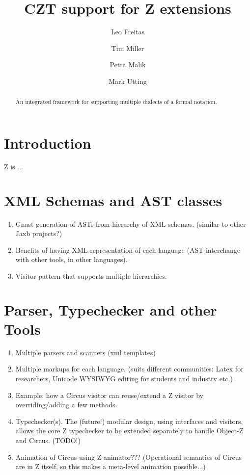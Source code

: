 \documentclass{llncs}
\begin{document}
\title{CZT support for Z extensions}
\author{Leo Freitas \and Tim Miller \and Petra Malik \and Mark Utting}
\maketitle

\begin{abstract}
  An integrated framework for supporting multiple dialects of a formal
  notation.
\end{abstract}


\section{Introduction} \label{sec:intro}

  Z\cite{isoz} is ...

\section{XML Schemas and AST classes}

  \begin{enumerate}
    \item Gnast generation of ASTs from hierarchy of XML schemas.
      (similar to other Jaxb projects?)

    \item Benefits of having XML representation of each language
      (AST interchange with other tools, in other languages).

    \item Visitor pattern that supports multiple hierarchies.
  \end{enumerate}

\section{Parser, Typechecker and other Tools}

  \begin{enumerate}
    \item Multiple parsers and scanners (xml templates)
    \item Multiple markups for each language.
      (suits different communities:  Latex for researchers,
      Unicode WYSIWYG editing for students and industry etc.)
    \item Example: how a Circus visitor can reuse/extend a Z visitor
      by overriding/adding a few methods.
    \item Typechecker(s).
      The (future!) modular design, using interfaces and visitors,
      allows the core Z typechecker to be extended separately
      to handle Object-Z and Circus.  (TODO!)
    \item Animation of Circus using Z animator???
      (Operational semantics of Circus are in Z itself,
      so this makes a meta-level animation possible...) 
  \end{enumerate}
\end{document}

